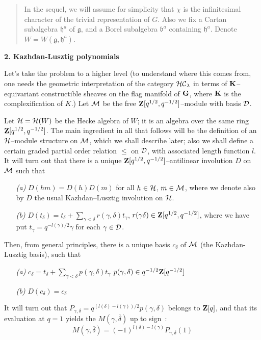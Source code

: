 \documentclass[11 pt]{article}
\def\ds{\displaystyle}
\def\ov{\overline}
\def\b{{\mathfrak b}}
\def\D{{\cal D}}
\def\d{\delta}
\def\G{{\bf G}}
\def\g{\gamma}
\def\gf{{\mathfrak g}}
\def\HC{{\cal HC}}
\def\Hc{{\cal H}}
\def\hf{{\mathfrak h}}
\def\K{{\bf K}}
\def\l{\lambda}
\def\M{{\cal M}}
\def\Z{{\bf Z}}
\def\Zq{\Z[q^{1/2},q^{-1/2}]}
\begin{document}
\medskip

\begin{quote}\noindent
In the sequel, we will assume for simplicity that $\chi$ is the 
infinitesimal character of the trivial representation of $G$. Also we fix a 
Cartan subalgebra $\hf^a$ of $\gf$, and a Borel
subalgebra $\b^a$ containing $\hf^a$.
Denote $W=W(\gf,\hf^a)$.
\end{quote}

\vfill\eject

\noindent\textbf{2. Kazhdan-Lusztig polynomials}

\medskip

Let's take the problem to a higher level (to understand where this comes from,
one needs the geometric interpretation of the category $\HC_\l$ in terms of 
$\K$--equivariant constructible sheaves on the flag manifold of $\G$, where 
$\K$ is the complexification of $K$.) Let $\M$ be the free $\Zq$--module with
basis $\D$.

Let $\Hc=\Hc(W)$ be the Hecke algebra of $W$; it is an algebra over the
same ring $\Zq$. The main ingredient in all that follows will be the
definition of an $\Hc$--module structure on $\M$, which we shall describe
later; also we shall define a certain graded partial order relation $\leq$ on 
$\D$, with associated length function $l$. It will turn out that there is a 
unique $\Zq$--antilinear involution $D$ on $\M$ such that

\begin{itemize}
\item[\it(a)]$D(hm)=D(h)D(m)$ for all $h\in\Hc$, $m\in\M$, where we denote
also by $D$ the usual Kazhdan--Lusztig involution on $\Hc$.
\item[\it(b)]$D(t_\d)=t_\d+\sum_{\g<\d}r(\g,\d)t_\g$, $r(\g\d)\in\Zq$, where 
we have put $t_\g=q^{-l(\g)/2}\g$ for each $\g\in\D$.
\end{itemize}

Then, from general principles, there is a unique basis $c_\d$ of $\M$ (the 
Kazhdan-Lusztig basis), such that

\begin{itemize}
\item[\it(a)]$\ds{c_\d=t_\d+\sum_{\g<\d}p(\g,\d)t_\g}$\hspace{.5cm}
$p(\g,\d)\in q^{-1/2}\Z[q^{-1/2}]$
\item[\it(b)]$D(c_\d)=c_\d$
\end{itemize}

It will turn out that $P_{\g,\d}=q^{(l(\d)-l(\g))/2}p(\g,\d)$ belongs to
$\Z[q]$, and that its evaluation at $q=1$ yields the $M(\g,\ov\d)$ up to sign~:
$$
M(\g,\ov\d)=(-1)^{l(\d)-l(\g)}P_{\g,\d}(1)
$$
\end{document}
